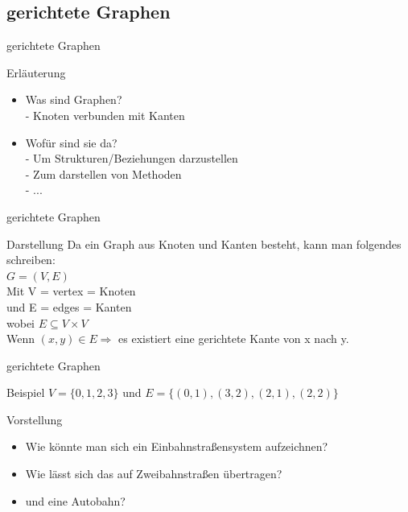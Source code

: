 	\subsection{gerichtete Graphen}
	\begin{frame}{gerichtete Graphen}
		\begin{block}{Erläuterung}
			\begin{itemize}
				\item Was sind Graphen?\\
					- Knoten verbunden mit Kanten
				
				\item Wofür sind sie da?\\
					- Um Strukturen/Beziehungen darzustellen\\
					- Zum darstellen von Methoden\\
					- ...
			\end{itemize}			 
		\end{block}
	\end{frame}
	
	
	\begin{frame}{gerichtete Graphen}
		\begin{block}{Darstellung}
			Da ein Graph aus Knoten und Kanten besteht, kann man folgendes schreiben:\\
			$G = ( V, E )$\\
			Mit V = vertex = Knoten\\
			und E = edges = Kanten\\
			wobei $E \subseteq V \times V$\\
			\vspace{10pt}
			Wenn $(x,y) \in E \Rightarrow$ es existiert eine gerichtete Kante von x nach y.
		\end{block}
	\end{frame}
	
	
	\begin{frame}{gerichtete Graphen}
		\begin{exampleblock}{Beispiel}
			$ V = \{0, 1, 2, 3\}$ und $E = \{(0,1), (3,2), (2,1), (2,2)\}$
		\end{exampleblock}
		
		\begin{block}{Vorstellung}
			\begin{itemize}
				\pause
				\item Wie könnte man sich ein Einbahnstraßensystem aufzeichnen?

				\pause
				\item Wie lässt sich das auf Zweibahnstraßen übertragen?
				
				\pause
				\item und eine Autobahn?
			\end{itemize}
			
		\end{block}
	\end{frame}
	
